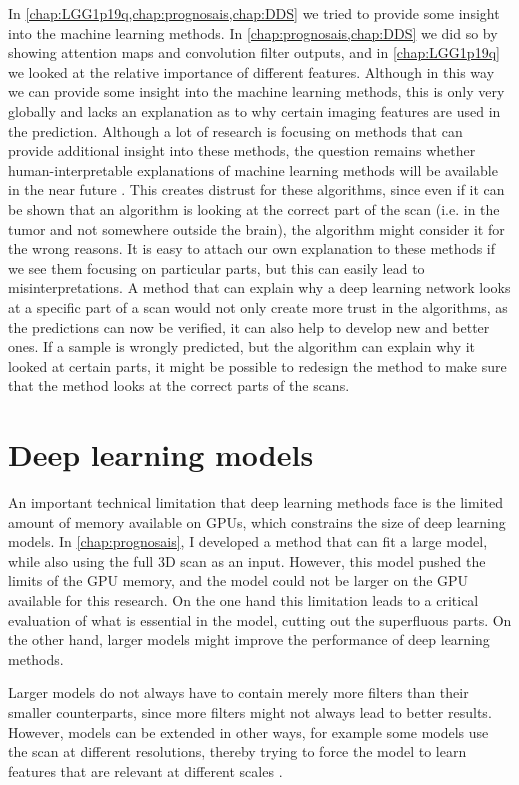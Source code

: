 In \cref{chap:LGG1p19q,chap:prognosais,chap:DDS} we  tried to provide some insight into the machine learning methods.
In \cref{chap:prognosais,chap:DDS} we did so by showing attention maps and convolution filter outputs, and in \cref{chap:LGG1p19q} we looked at the relative importance of different features.
Although in this way we can provide some insight into the machine learning methods, this is only very globally and lacks an explanation as to why certain imaging features are used in the prediction.
Although a lot of research is focusing on methods that can provide additional insight into these methods, the question remains whether human-interpretable explanations of machine learning methods will be available in the near future \autocite{zhang2018interpretable}.
This creates distrust for these algorithms, since even if it can be shown that an algorithm is looking at the correct part of the scan (i.e. in the tumor and not somewhere outside the brain), the algorithm might consider it for the wrong reasons.
It is easy to attach our own explanation to these methods if we see them focusing on particular parts, but this can easily lead to misinterpretations.
A method that can explain why a deep learning network looks at a specific part of a scan would not only create more trust in the algorithms, as the predictions can now be verified, it can also help to develop new and better ones.
If a sample is wrongly predicted, but the algorithm can explain why it looked at certain parts, it might be possible to redesign the method to make sure that the method looks at the correct parts of the scans.

\section{Deep learning models}

An important technical limitation that deep learning methods face is the limited amount of memory available on GPUs, which constrains the size of deep learning models.
In \cref{chap:prognosais}, I developed a method that can fit a large model, while also using the full 3D scan as an input.
However, this model pushed the limits of the GPU memory, and the model could not be larger on the GPU available for this research.
On the one hand this limitation leads to a critical evaluation of what is essential in the model, cutting out the superfluous parts.
On the other hand, larger models might improve the performance of deep learning methods.

Larger models do not always have to contain merely more filters than their smaller counterparts, since more filters might not always lead to better results.
However, models can be extended in other ways, for example some models use the scan at different resolutions, thereby trying to force the model to learn features that are relevant at different scales \autocite{akkus20171p19q}.

